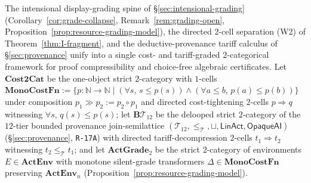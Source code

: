 \documentclass[11pt]{article}
\theoremstyle{plain}
\theoremstyle{definition}
\begin{document}
The intensional display-grading spine of \S\ref{sec:intensional-grading} (Corollary~\ref{cor:grade-collapse}, Remark~\ref{rem:grading-open}, Proposition~\ref{prop:resource-grading-model}), the directed $2$-cell separation \textup{(W2)} of Theorem~\ref{thm:I-fragment}, and the deductive-provenance tariff calculus of \S\ref{sec:provenance} unify into a single cost- and tariff-graded $2$-categorical framework for proof compressibility and choice-free algebraic certificates. Let $\mathbf{Cost2Cat}$ be the one-object strict $2$-category with $1$-cells $\mathbf{MonoCostFn} := \{p : \mathbb{N} \to \mathbb{N} \mid (\forall s,\, s \le p(s)) \wedge (\forall a \le b,\, p(a) \le p(b))\}$ under composition $p_1 \gg p_2 := p_2 \circ p_1$ and directed cost-tightening $2$-cells $p \Rightarrow q$ witnessing $\forall s,\, q(s) \le p(s)$; let $\mathbf{B}\mathcal{T}_{12}$ be the delooped strict $2$-category of the $12$-tier bounded provenance join-semilattice $(\mathcal{T}_{12}, \le_{\mathcal{T}}, \sqcup, \mathsf{LinAct}, \mathsf{OpaqueAI})$ (\S\ref{sec:provenance}, \texttt{R-17A}) with directed tariff-decompression $2$-cells $t_1 \Rightarrow t_2$ witnessing $t_2 \le_{\mathcal{T}} t_1$; and let $\mathbf{ActGrade}_2$ be the strict $2$-category of environments $E \in \mathbf{ActEnv}$ with monotone silent-grade transformers $\Delta \in \mathbf{MonoCostFn}$ preserving $\mathbf{ActEnv}_n$ (Proposition~\ref{prop:resource-grading-model}).
\end{document}
